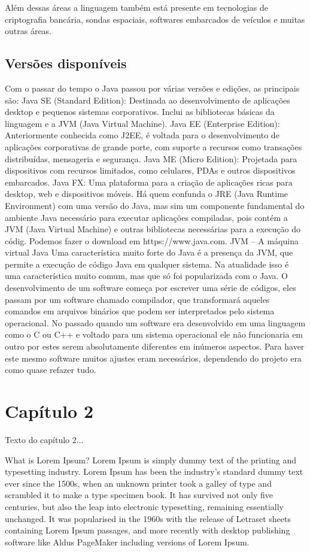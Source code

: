\documentclass{article}
\begin{document}
Além dessas áreas a linguagem também está presente em tecnologias de criptografia bancária, sondas espaciais, softwares embarcados de veículos e muitas outras áreas.

\subsection{Versões disponíveis}
\justify
Com o passar do tempo o Java passou por várias versões e edições, as principais são:
Java SE (Standard Edition): Destinada ao desenvolvimento de aplicações desktop e pequenos sistemas corporativos. Inclui as bibliotecas básicas da linguagem e a JVM (Java Virtual Machine).
Java EE (Enterprise Edition): Anteriormente conhecida como J2EE, é voltada para o desenvolvimento de aplicações corporativas de grande porte, com suporte a recursos como transações distribuídas, mensageria e segurança.
Java ME (Micro Edition): Projetada para dispositivos com recursos limitados, como celulares, PDAs e outros dispositivos embarcados.
Java FX: Uma plataforma para a criação de aplicações ricas para desktop, web e dispositivos móveis.
Há quem confunda o JRE (Java Runtime Environment) com uma versão do Java, mas sim um componente fundamental do ambiente Java necessário para executar aplicações compiladas, pois contém a JVM (Java Virtual Machine) e outras bibliotecas necessárias para a execução do códig. Podemos fazer o download em https://www.java.com.
JVM – A máquina virtual Java
Uma característica muito forte do Java é a presença da JVM, que permite a execução de código Java em qualquer sistema. Na atualidade isso é uma característica muito comum, mas que só foi popularizada com o Java. O desenvolvimento de um software começa por escrever uma série de códigos, eles passam por um software chamado compilador, que transformará aqueles comandos em arquivos binários que podem ser interpretados pelo sistema operacional.
No passado quando um software era desenvolvido em uma linguagem como o C ou C++ e voltado para um sistema operacional ele não funcionaria em outro por estes serem absolutamente diferentes em inúmeros aspectos. Para haver este mesmo software muitos ajustes eram necessários, dependendo do projeto era como quase refazer tudo.

\newpage
\section{Capítulo 2}
Texto do capítulo 2...

What is Lorem Ipsum?
Lorem Ipsum is simply dummy text of the printing and typesetting industry. Lorem Ipsum has been the industry's standard dummy text ever since the 1500s, when an unknown printer took a galley of type and scrambled it to make a type specimen book. It has survived not only five centuries, but also the leap into electronic typesetting, remaining essentially unchanged. It was popularised in the 1960s with the release of Letraset sheets containing Lorem Ipsum passages, and more recently with desktop publishing software like Aldus PageMaker including versions of Lorem Ipsum.
\end{document}
